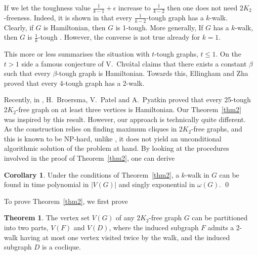 \documentclass{amsart}
\theoremstyle{definition}
\newtheorem{theorem}{Theorem}
\newtheorem{corollary}{Corollary}
\begin{document}
If we let the toughness value $\frac{1}{k-1}+\epsilon$ increase to 
$\frac{1}{k-2}$ then
one does not need $2K_2$-freeness. Indeed, it is shown in 
\cite{jackson1990k} that
every $\frac{1}{k-2}$-tough graph has a $k$-walk. 
Clearly, if $G$ is
Hamiltonian, then $G$ is 1-tough.  More generally, 
If $G$ has a $k$-walk, then $G$ is $\frac{1}{k}$-tough \cite{jackson1990k}.
However, the converse is not true already for $k=1$.  

This more or less summarises the situation with $t$-tough graphs, $t\leq 1$.
On the $t>1$ side 
a famous conjecture of V.~Chv\'{a}tal \cite{chvatal1973tough} claims
that there exists a constant $\beta$ such that every
$\beta$-tough graph is Hamiltonian.  
Towards this, 
Ellingham and Zha \cite{ellingham2000toughness} proved that
every 4-tough graph has a 2-walk.

Recently, in \cite{broersma2014toughness}, H.~Broersma, V.~Patel and A.~Pyatkin proved that 
every 25-tough 2$K_2$-free graph on at least three vertices is Hamiltonian.
Our Theorem~\ref{thm2} was inspired by this result.  
However, our approach is technically quite different. 
As the construction relies on finding maximum cliques in
$2K_2$-free graphs, and this is known to be NP-hard, 
unlike \cite{broersma2014toughness}, it does not yield an 
unconditional algorithmic solution of the problem at hand.
By looking at the procedures involved in the proof of Theorem~\ref{thm2}, 
one can derive
\begin{corollary}\label{alg}
Under the conditions of Theorem~\ref{thm2}, a $k$-walk in $G$ can be found in
time polynomial in $|V(G)|$ and singly exponential in $\omega(G)$. \qed
\end{corollary}

To prove Theorem~\ref{thm2}, we first prove
\begin{theorem}\label{addgen1} 
The  vertex set $V(G)$ of any $2K_2$-free graph $G$
can be partitioned into two parts, $V(F)$ and $V(D)$, where the
induced subgraph $F$ admits a 2-walk having at most one vertex visited twice by
the walk, and the induced subgraph $D$ is a coclique.
\end{theorem}
\end{document}
